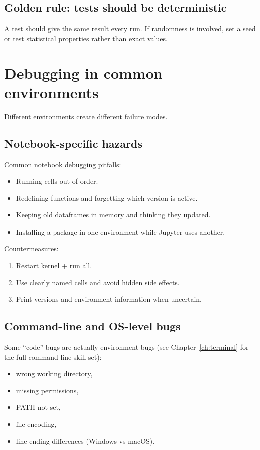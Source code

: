 \subsection{Golden rule: tests should be deterministic}
A test should give the same result every run. If randomness is involved, set a seed or test statistical properties rather than exact values.

\section{Debugging in common environments}
Different environments create different failure modes.

\subsection{Notebook-specific hazards}
Common notebook debugging pitfalls:
\begin{itemize}[noitemsep]
  \item Running cells out of order.
  \item Redefining functions and forgetting which version is active.
  \item Keeping old dataframes in memory and thinking they updated.
  \item Installing a package in one environment while Jupyter uses another.
\end{itemize}

Countermeasures:
\begin{enumerate}[noitemsep]
  \item Restart kernel + run all.
  \item Use clearly named cells and avoid hidden side effects.
  \item Print versions and environment information when uncertain.
\end{enumerate}

\subsection{Command-line and OS-level bugs}
Some ``code'' bugs are actually environment bugs (see Chapter~\ref{ch:terminal} for the full command-line skill set):
\begin{itemize}[noitemsep]
  \item wrong working directory,
  \item missing permissions,
  \item PATH not set,
  \item file encoding,
  \item line-ending differences (Windows vs macOS).
\end{itemize}

